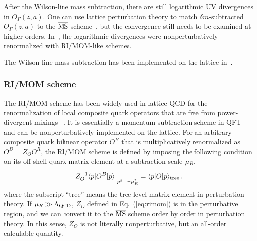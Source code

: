 \documentclass[aps,rmp,reprint,amsmath,amssymb,graphicx,longbibliography]{revtex4-1} %
\newcommand{\MS}{{\overline{\rm MS}}}
\DeclareRobustCommand{\eq}[1]{Eq.~(\ref{eq:#1})}
\begin{document}
After the Wilson-line mass subtraction, there are still logarithmic UV divergences in $O_\Gamma(z,a)$. One can use lattice perturbation theory to match $\delta m$-subtracted $O_\Gamma(z,a)$ to the $\MS$ scheme~\cite{Ishikawa:2016znu,Xiong:2017jtn,Constantinou:2017sej}, but the convergence still needs to be examined at higher orders. In~\cite{Green:2017xeu,Green:2020xco}, the logarithmic divergences were nonperturbatively renormalized with RI/MOM-like schemes.

The Wilson-line mass-subtraction has been implemented on the lattice in~\cite{Musch:2010ka,Zhang:2017bzy,Green:2017xeu,Chen:2017gck,Alexandrou:2020qtt}.

\subsubsection{RI/MOM scheme}
\label{sec:renorm-npr-rimom}

The RI/MOM scheme has been widely used in lattice QCD for the renormalization of local composite quark operators that are free from power-divergent mixings ~\cite{Martinelli:1994ty}. It is essentially a momentum subtraction scheme in QFT and can be nonperturbatively implemented on the lattice. For an arbitrary composite quark bilinear operator $O^B$ that is multiplicatively renormalized as $O^B=Z_OO^R$, the RI/MOM scheme is defined by imposing the following condition on its off-shell quark matrix element at a subtraction scale $\mu_{\tiny R}$,
\begin{align} \label{eq:rimom}
	Z^{-1}_O \langle p|O^B|p\rangle \Big|_{p^2=-\mu_{\tiny R}^2}= \langle p|O|p\rangle_{\rm tree}\,.
\end{align}
where the subscript ``tree'' means the tree-level matrix element in perturbation theory. If $\mu_{\tiny R} \gg \Lambda_{\rm QCD}$, $Z_O$ defined in \eq{rimom} is in the perturbative region, and we can convert it to the $\MS$ scheme order by order in perturbation theory. In this sense, $Z_O$ is not literally nonperturbative, but an all-order calculable quantity.
\end{document}

